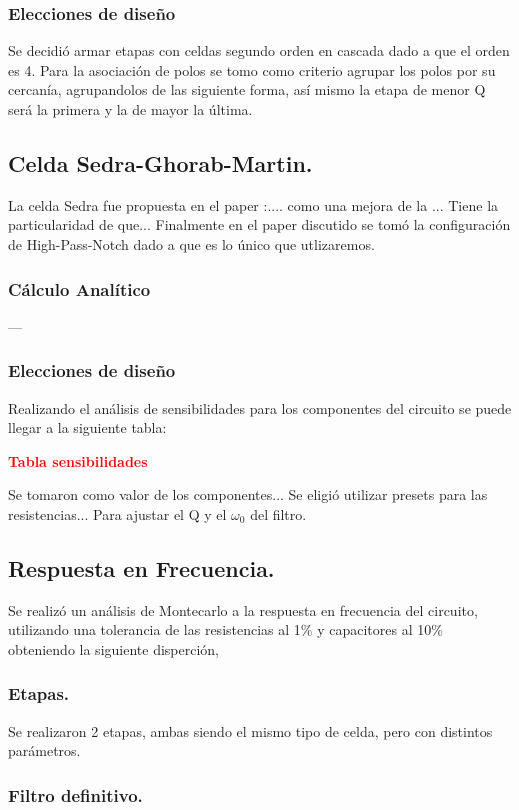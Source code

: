 \subsubsection{Elecciones de diseño}
Se decidió armar etapas con celdas segundo orden en cascada dado a que el orden es 4.
Para la asociación de polos se tomo como criterio agrupar los polos por su cercanía, agrupandolos de las siguiente forma, así mismo la etapa de menor Q será la primera y la de mayor la última.
\subsection{Celda Sedra-Ghorab-Martin.}
La celda Sedra fue propuesta en el paper :....
como una mejora de la ...
Tiene la particularidad de que...
Finalmente en el paper discutido se tomó la configuración de High-Pass-Notch dado a que es lo único que utlizaremos.
\subsubsection{Cálculo Analítico}
---
\subsubsection{Elecciones de diseño}
Realizando el análisis de sensibilidades para los componentes del circuito se puede llegar a la siguiente tabla: 
\begin{center}
	\huge{\textcolor{red}{\textbf{Tabla sensibilidades}}}
\end{center}

Se tomaron como valor de los componentes...
Se eligió utilizar presets para las resistencias... Para ajustar el Q y el $\omega_0$ del filtro.
\subsection{Respuesta en Frecuencia.}
Se realizó un análisis de Montecarlo a la respuesta en frecuencia del circuito, utilizando una tolerancia de las resistencias al 1$\%$ y capacitores al 10$\%$ obteniendo la siguiente disperción,
\subsubsection{Etapas.}
Se realizaron 2 etapas, ambas siendo el mismo tipo de celda, pero con distintos parámetros.
\subsubsection{Filtro definitivo.}
%
